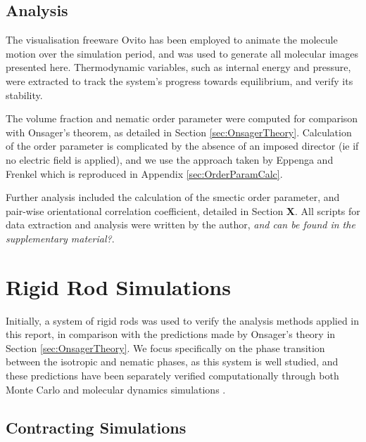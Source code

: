 \documentclass[11pt, a4paper]{article} %
\begin{document}
 
\subsection{Analysis}
The visualisation freeware Ovito \cite{Ovito} has been employed to animate the molecule motion over the simulation period, and was used to generate all molecular images presented here. Thermodynamic variables, such as internal energy and pressure, were extracted to track the system's progress towards equilibrium, and verify its stability.

The volume fraction and nematic order parameter were computed for comparison with Onsager's theorem, as detailed in Section \ref{sec:OnsagerTheory}. Calculation of the order parameter is complicated by the absence of an imposed director (ie if no electric field is applied), and we use the approach taken by Eppenga and Frenkel \cite{Eppenga1984} which is reproduced in Appendix \ref{sec:OrderParamCalc}. %

Further analysis included the calculation of the smectic order parameter, and pair-wise orientational correlation coefficient, detailed in Section \textbf{X}. All scripts for data extraction and analysis were written by the author, \textit{and can be found in the supplementary material?}.



\section{Rigid Rod Simulations} \label{sec:RigidRodSims}


Initially, a system of rigid rods was used to verify the analysis methods applied in this report, in comparison with the predictions made by Onsager's theory in Section \ref{sec:OnsagerTheory}. We focus specifically on the phase transition between the isotropic and nematic phases, as this system is well studied, and these predictions have been separately verified computationally through both Monte Carlo \cite{Frenkel1984, Lee1987} and molecular dynamics simulations \cite{Allen1987, Camp1996}.

\subsection{Contracting Simulations}
\end{document}
